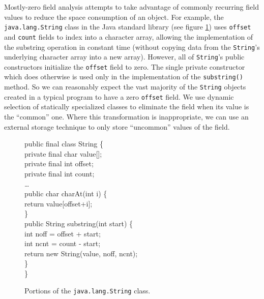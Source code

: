 \documentclass[preprint]{acmconf}
\begin{document}
Mostly-zero field analysis attempts to take advantage of commonly
recurring field values to reduce the space consumption of an object.
For example, the {\tt java.lang.String} class in the Java standard
library (see figure \ref{fig:string-fields}) uses {\tt offset} and
{\tt count} fields to index into a character array, allowing the
implementation of the substring operation in constant time (without
copying data from the {\tt String}'s underlying character array into a
new array).  However, all of {\tt String}'s public constructors
initialize the {\tt offset} field to zero.  The single private
constructor which does otherwise is used only in the implementation of
the {\tt substring()} method.  So we can reasonably expect the vast
majority of the {\tt String} objects created in a typical program to
have a zero {\tt offset} field.  We use dynamic selection of
statically specialized classes to eliminate the field when its value
is the ``common'' one.  Where this transformation is inappropriate, we
can use an external storage technique to only store ``uncommon''
values of the field.
\begin{figure}
\begin{samplecode}
public final class String \{\\
\>private final char value[];\\
\>private final int offset;\\
\>private final int count;\\
\>\ldots\\
\>public char charAt(int i) \{\\
\>\>return value[offset+i];\\
\>\}\\
\>public String substring(int start) \{\\
\>\>int noff = offset + start;\\
\>\>int ncnt = count - start;\\
\>\>return new String(value, noff, ncnt);\\
\>\}\\
\}\\
\end{samplecode}
\caption{Portions of the {\tt java.lang.String} class.}
\label{fig:string-fields}
\end{figure}
\end{document}
